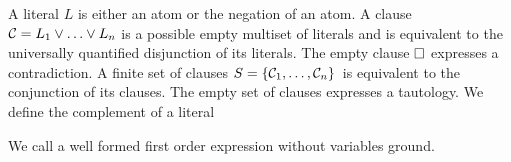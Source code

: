 
\begin{definition}\label{def:literals}
A {\myem literal} $L$ is either an atom or the negation of an atom.
%
A {\myem clause}\ \ ${\mathcal C} = L_1\lor\ldots\lor L_n$  is a possible empty multiset of literals 
and is equivalent to the universally quantified disjunction of its literals.
The {\myem empty clause} $\square$ expresses a contradiction. 
%
A finite {\myem set of clauses} $S=\{ {\mathcal C}_1,\ldots,{\mathcal C}_n \}$ is equivalent to the conjunction of its clauses.
The empty set of clauses expresses a tautology.
%
We define the {\myem complement }of a literal 
\end{definition}

\begin{definition}
	We call a well formed first order expression without variables {\myem ground}.
\end{definition}


